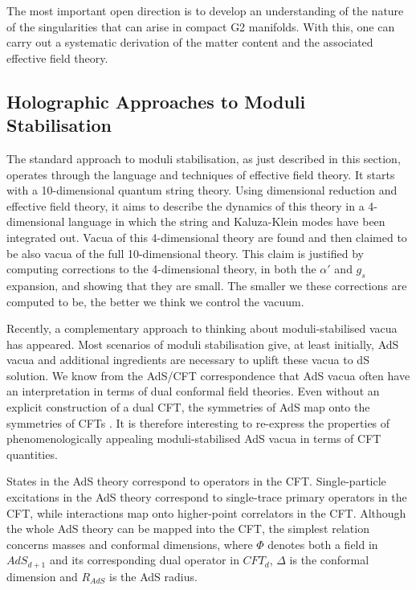     The most important open direction is to develop an understanding of the  nature of the singularities that can arise in compact  G2 manifolds. With this,
  one can carry out a systematic derivation of the matter content and the associated effective field theory.
  
	
 \subsection{Holographic Approaches to Moduli Stabilisation}
 
The standard approach to moduli stabilisation, as just described in this section, operates through the language and techniques of
effective field theory. It starts with a 10-dimensional quantum string theory. Using dimensional reduction and effective field theory, it aims to describe the dynamics of this theory in a 4-dimensional language in which the string and Kaluza-Klein modes have been integrated out. Vacua of
 this 4-dimensional theory are found and then claimed to be also vacua of the full 10-dimensional theory. This claim is justified
 by computing corrections to the 4-dimensional theory, in both the $\alpha'$ and $g_s$ expansion, and showing that they are small. The smaller we these corrections are computed to be, the better we think we control the vacuum.

Recently, a complementary approach to thinking about moduli-stabilised vacua has appeared. Most scenarios of moduli stabilisation give, at least initially, AdS vacua and additional ingredients are necessary to uplift these vacua to dS solution. We know from the AdS/CFT correspondence that AdS vacua often have an interpretation in terms of dual conformal field theories. Even without an explicit construction of a dual CFT, the symmetries of AdS map onto the symmetries of CFTs \cite{Heemskerk:2009pn}. It is therefore interesting to re-express the properties 
of phenomenologically appealing moduli-stabilised AdS vacua in terms of CFT quantities.

States in the AdS theory correspond to operators in the CFT. Single-particle excitations in the AdS theory correspond to single-trace primary operators in the CFT, while interactions map onto higher-point correlators in the CFT. Although the whole AdS theory can be mapped into the CFT, the simplest relation concerns masses and conformal dimensions,
\be
\setlength\fboxsep{0.25cm}
\setlength\fboxrule{0.4pt}
\ee
where $\Phi$ denotes both a field in $AdS_{d+1}$ and its corresponding dual operator in $CFT_{d}$, $\Delta$ is the conformal dimension and $R_{AdS}$ is the AdS radius. 


